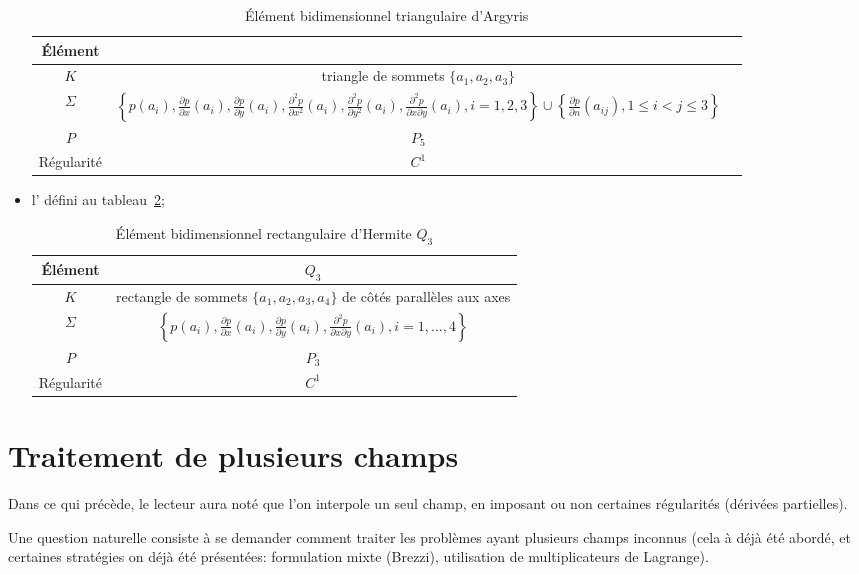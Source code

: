 \begin{itemize}
\begin{table}
\begin{tabular}{c|cc}
Élément & \\
\hline
$K$	   & triangle de sommets $\{a_1, a_2, a_3\}$ \\
$\Sigma$  & $\left\{p(a_i), \frac{\partial p}{\partial x}(a_i), \frac{\partial p}{\partial y}(a_i),
		\frac{\partial^2 p}{\partial x^2}(a_i), \frac{\partial^2 p}{\partial y^2}(a_i),
		\frac{\partial^2 p}{\partial x\partial y}(a_i), i=1, 2, 3\right\}
		\cup\left\{\frac{\partial p}{\partial n}(a_{ij}), 1\le i<j\le3\right\}$\\
$P$      & $P_5$\\
Régularité & $C^1$\\
\hline
\end{tabular}
\caption{Élément bidimensionnel triangulaire d'Argyris}\label{tab:ElemA:bi}
\end{table}
\item l' défini au tableau~\ref{tab:ElemH:bibi};

\begin{table}[ht]\centering\small
\begin{tabular}{c|c}
Élément & $Q_3$ \\
\hline
$K$	   & rectangle de sommets $\{a_1, a_2, a_3, a_4\}$ de côtés parallèles aux axes\\
$\Sigma$  & $\left\{p(a_i), \frac{\partial p}{\partial x}(a_i), \frac{\partial p}{\partial y}(a_i),
	\frac{\partial^2 p}{\partial x\partial y}(a_i), i=1,\ldots, 4\right\}$\\
$P$      & $P_3$ \\
Régularité & $C^1$\\
\hline
\end{tabular}
\caption{Élément bidimensionnel rectangulaire d'Hermite $Q_3$}\label{tab:ElemH:bibi}
\end{table}
\end{itemize}

\medskip
\section{Traitement de plusieurs champs}\label{Sec-interf}
Dans ce qui précède, le lecteur aura noté que l'on interpole un seul
champ, en imposant ou non certaines régularités (dérivées partielles).

\medskip
Une question naturelle consiste à se demander comment traiter les
problèmes ayant plusieurs champs inconnus (cela à déjà été abordé,
et certaines stratégies on déjà été présentées: formulation mixte (Brezzi),
utilisation de multiplicateurs de Lagrange).


